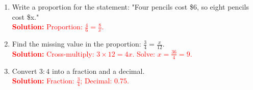 \documentclass[12pt]{article}
\begin{document}
\begin{tcolorbox}[colframe=black!60, colback=white, 
coltitle=black, colbacktitle=black!15, fonttitle=\bfseries\Large, 
title=Exercises, halign title=center, left=10pt, right=10pt, top=10pt, bottom=60pt]
\begin{enumerate}[itemsep=2em]
    \item Write a proportion for the statement: "Four pencils cost \$6, so eight pencils cost \$x."\\
    \textcolor{red}{\textbf{Solution:} Proportion: \( \frac{4}{6} = \frac{8}{x} \).}

    \item Find the missing value in the proportion: \( \frac{3}{4} = \frac{x}{12} \).\\
    \textcolor{red}{\textbf{Solution:} Cross-multiply: \( 3 \times 12 = 4x \). Solve: \( x = \frac{36}{4} = 9 \).}

    \item Convert \( 3:4 \) into a fraction and a decimal.\\
    \textcolor{red}{\textbf{Solution:} Fraction: \( \frac{3}{4} \); Decimal: \( 0.75 \).}
\end{enumerate}
\end{tcolorbox}
\end{document}

